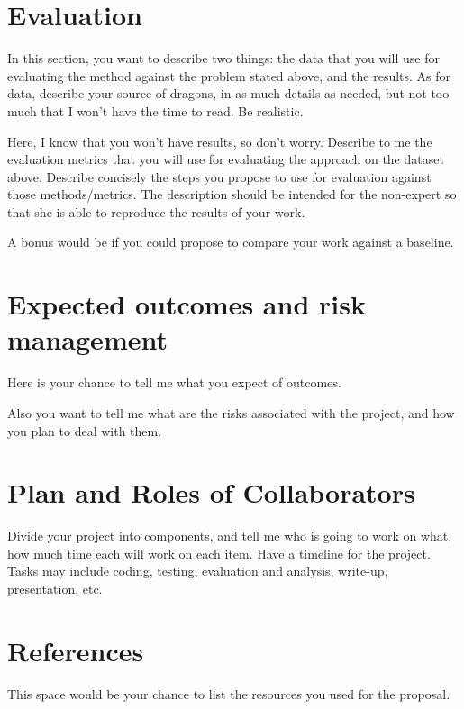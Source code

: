\documentclass[conference]{sig-alternate-05-2015}
\begin{document}
\section{Evaluation}\label{sec:evaluation}

\color{red}In this section, you want to describe two things: the data that you will use for evaluating the method against the problem stated above, and the results. As for data, describe your source of dragons, in as much details as needed, but not too much that I won't have the time to read. Be realistic. 

Here, I know that you won't have results, so don't worry. Describe to me the evaluation metrics that you will use for evaluating the approach on the dataset above. Describe concisely the steps you propose to use for evaluation against those methods/metrics. The description should be intended for the non-expert so that she is able to reproduce the results of your work. 

A bonus would be if you could propose to compare your work against a baseline. 
\color{black}

\section{Expected outcomes and risk management}

\color{red}Here is your chance to tell me what you expect of outcomes. 

Also you want to tell me what are the risks associated with the project, and how you plan to deal with them. 
\color{black}

\section{Plan and Roles of Collaborators}
\color{red}Divide your project into components, and tell me who is going to work on what, how much time each will work on each item. Have a timeline for the project. Tasks may include coding, testing, evaluation and analysis, write-up, presentation, etc. 
\color{black}

\section{References}\label{sec:conclusion}
\color{red}This space would be your chance to list the resources you used for the proposal. 
\color{black}


\end{document}
